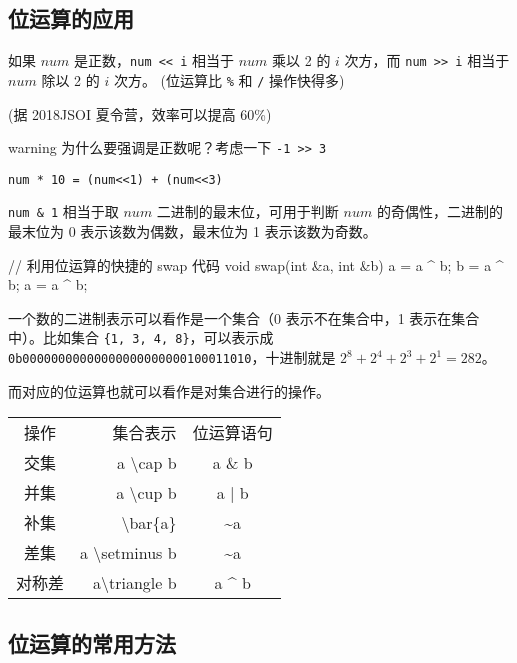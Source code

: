 \hr

\subsection{位运算的应用}

如果 $num$ 是正数，\texttt{num << i} 相当于 $num$ 乘以 2 的 $i$ 次方，而 \texttt{num >> i} 相当于 $num$ 除以 2 的 $i$ 次方。 (位运算比 \texttt{\%} 和 \texttt{/} 操作快得多)

(据 2018JSOI 夏令营，效率可以提高 60\%)

\begin{NOTE}{warning}{}
为什么要强调是正数呢？考虑一下 \texttt{-1 >> 3}

\end{NOTE}


\texttt{num * 10 = (num<<1) + (num<<3)}

\texttt{num \& 1} 相当于取 $num$ 二进制的最末位，可用于判断 $num$ 的奇偶性，二进制的最末位为 0 表示该数为偶数，最末位为 1 表示该数为奇数。

\begin{cppcode}
// 利用位运算的快捷的 swap 代码
void swap(int &a, int &b) {
  a = a ^ b;
  b = a ^ b;
  a = a ^ b;
}
\end{cppcode}

一个数的二进制表示可以看作是一个集合（0 表示不在集合中，1 表示在集合中）。比如集合 \texttt{\{1, 3, 4, 8\}}，可以表示成 \texttt{0b00000000000000000000000100011010}，十进制就是 $2^8+2^4+2^3+2^1=282$。

而对应的位运算也就可以看作是对集合进行的操作。

\begin{tabular}{crc}
\hline
操作& 集合表示& 位运算语句\\交集& a \textbackslash{}cap b& a \& b\\并集& a \textbackslash{}cup b& a | b\\补集& \textbackslash{}bar\{a\}& \textasciitilde{}a\\差集& a \textbackslash{}setminus b& \textasciitilde{}a\\对称差& a\textbackslash{}triangle b& a \textasciicircum{} b\\\hline
\end{tabular}

\hr

\subsection{位运算的常用方法}

